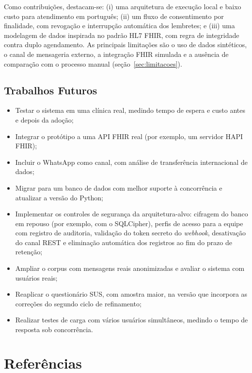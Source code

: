 \documentclass[12pt,a4paper]{extarticle}
\begin{document}
Como contribuições, destacam-se: (i) uma arquitetura de execução local e baixo custo para atendimento em português; (ii) um fluxo de consentimento por finalidade, com revogação e interrupção automática dos lembretes; e (iii) uma modelagem de dados inspirada no padrão HL7 FHIR, com regra de integridade contra duplo agendamento. As principais limitações são o uso de dados sintéticos, o canal de mensageria externo, a integração FHIR simulada e a ausência de comparação com o processo manual (seção~\ref{sec:limitacoes}).

\subsection{Trabalhos Futuros}
\label{sec:trabalhos-futuros}

\begin{itemize}
    \item Testar o sistema em uma clínica real, medindo tempo de espera e custo antes e depois da adoção;
    \item Integrar o protótipo a uma API FHIR real (por exemplo, um servidor HAPI FHIR);
    \item Incluir o WhatsApp como canal, com análise de transferência internacional de dados;
    \item Migrar para um banco de dados com melhor suporte à concorrência e atualizar a versão do Python;
    \item Implementar os controles de segurança da arquitetura-alvo: cifragem do banco em repouso (por exemplo, com o SQLCipher), perfis de acesso para a equipe com registro de auditoria, validação do token secreto do \textit{webhook}, desativação do canal REST e eliminação automática dos registros ao fim do prazo de retenção;
    \item Ampliar o corpus com mensagens reais anonimizadas e avaliar o sistema com usuários reais;
    \item Reaplicar o questionário SUS, com amostra maior, na versão que incorpora as correções do segundo ciclo de refinamento;
    \item Realizar testes de carga com vários usuários simultâneos, medindo o tempo de resposta sob concorrência.
\end{itemize}

\newpage
\section*{Referências}
\end{document}
